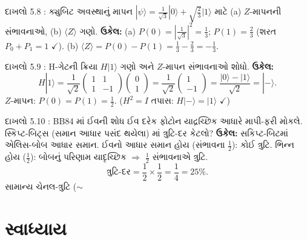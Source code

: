 \begin{dahlo}{દાખલો 5.8 : ક્યુબિટ અવસ્થાનું માપન}
$|\psi\rangle=\frac{1}{\sqrt3}|0\rangle+\sqrt{\frac23}|1\rangle$ માટે (a) $Z$-માપનની સંભાવનાઓ, (b) $\langle Z\rangle$ ગણો.
\tcblower
\textbf{ઉકેલ:} (a) $P(0)=|\tfrac1{\sqrt3}|^{2}=\tfrac13$; $P(1)=\tfrac23$ (શરત $P_0+P_1=1$ $\checkmark$).
(b) $\langle Z\rangle=P(0)-P(1)=\tfrac13-\tfrac23=-\tfrac13$.
\end{dahlo}

\begin{dahlo}{દાખલો 5.9 : H-ગેટની ક્રિયા}
$H|1\rangle$ ગણો અને $Z$-માપન સંભાવનાઓ શોધો.
\tcblower
\textbf{ઉકેલ:}
\[
H|1\rangle=\frac{1}{\sqrt2}\begin{pmatrix}1&1\\1&-1\end{pmatrix}\begin{pmatrix}0\\1\end{pmatrix}
=\frac{1}{\sqrt2}\begin{pmatrix}1\\-1\end{pmatrix}=\frac{|0\rangle-|1\rangle}{\sqrt2}=|-\rangle .
\]
$Z$-માપન: $P(0)=P(1)=\tfrac12$. ($H^2=I$ તપાસ: $H|-\rangle=|1\rangle$ $\checkmark$)
\end{dahlo}

\begin{dahlo}{દાખલો 5.10 : BB84 માં ઈવની શોધ}
ઈવ દરેક ફોટોન યાદ્રચ્છિક આધારે માપી-ફરી મોકલે. સ્કિપ્ટ-બિટ્સ (સમાન આધાર પસંદ થયેલા) માં ત્રુટિ-દર કેટલો?
\tcblower
\textbf{ઉકેલ:} સકિપ્ટ-બિટમાં એલિસ-બોબ આધાર સમાન. ઈવનો આધાર સમાન હોય (સંભાવના $\tfrac12$): કોઈ ત્રુટિ. ભિન્ન હોય ($\tfrac12$): બોબનું પરિણામ યાદૃચ્છિક $\Rightarrow$ $\tfrac12$ સંભાવનાએ ત્રુટિ.
\[
\text{ત્રુટિ-દર}=\frac12\times\frac12=\frac14=25\% .
\]
સામાન્ય ચેનલ-ત્રુટિ ($\sim$%
\end{dahlo}

\section{સ્વાધ્યાય}

